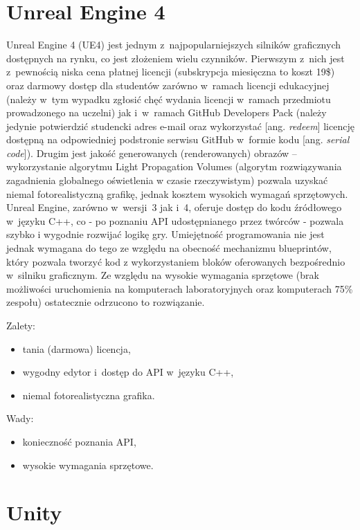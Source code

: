 \section{Unreal Engine 4}
Unreal Engine 4 (UE4) jest jednym z~najpopularniejszych silników graficznych dostępnych na rynku, co jest złożeniem wielu czynników. Pierwszym z~nich jest z~pewnością niska cena płatnej licencji (subskrypcja miesięczna to koszt 19\$) oraz darmowy dostęp dla studentów zarówno w~ramach licencji edukacyjnej (należy w~tym wypadku zgłosić chęć wydania licencji w~ramach przedmiotu prowadzonego na uczelni) jak i~w~ramach GitHub Developers Pack (należy jedynie potwierdzić studencki adres e-mail oraz wykorzystać [ang. \emph{redeem}] licencję dostępną na odpowiedniej podstronie serwisu GitHub w~formie kodu [ang. \emph{serial code}]). Drugim jest jakość generowanych (renderowanych) obrazów -- wykorzystanie algorytmu Light Propagation Volumes (algorytm rozwiązywania zagadnienia globalnego oświetlenia w czasie rzeczywistym) pozwala uzyskać niemal fotorealistyczną grafikę, jednak kosztem wysokich wymagań sprzętowych.
Unreal Engine, zarówno w~wersji~3 jak i~4, oferuje dostęp do kodu źródłowego w~języku C++, co - po poznaniu API udostępnianego przez twórców - pozwala szybko i wygodnie rozwijać logikę gry. Umiejętność programowania nie jest jednak wymagana do tego ze względu na obecność mechanizmu blueprintów, który pozwala tworzyć kod z wykorzystaniem bloków oferowanych bezpośrednio w~silniku graficznym.
Ze względu na wysokie wymagania sprzętowe (brak możliwości uruchomienia na komputerach laboratoryjnych oraz komputerach 75\% zespołu) ostatecznie odrzucono to rozwiązanie.\\

{\raggedright Zalety:
\begin{itemize}
\item tania (darmowa) licencja,
\item wygodny edytor i~dostęp do API w~języku C++,
\item niemal fotorealistyczna grafika.
\end{itemize}

Wady:
\begin{itemize}
\item konieczność poznania API,
\item wysokie wymagania sprzętowe.
\end{itemize}
}
\section{Unity}

